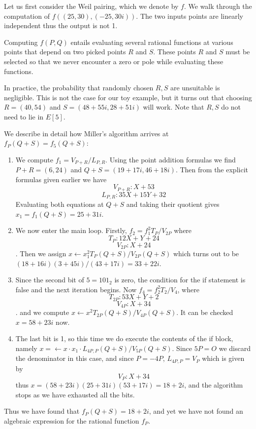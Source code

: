 Let us first consider the Weil pairing, which we denote by $f$.
We walk through the computation of $f((25,30), (-25,30i))$.
The two inputs points are linearly independent thus the output is not 1.

Computing $f(P, Q)$ entails evaluating several rational functions
at various points that depend on two picked points $R$ and $S$.
These points $R$ and $S$ must be selected so that we never encounter a
zero or pole while evaluating these functions.

In practice, the probability that randomly chosen $R, S$ are unsuitable
is negligible. This is not the case for our toy example, but it turns
out that choosing $R = (40,54)$ and $S = (48+55i,28+51i)$
will work. Note that $R, S$ do not need to lie in $E[5]$.

We describe in detail how Miller's algorithm arrives at $f_P(Q+S) = f_5(Q+S)$:
\begin{enumerate}
\item
We compute $f_1 = V_{P+R} / L_{P,R}$.
Using the point addition formulas we find $P+R = (6,24)$
and $Q+S=(19+17i, 46+18i)$.
Then
from the explicit formulas given earlier we have
\[ V_{P+R} : X + 53 \]
\[ L_{P,R} : 35 X + 15 Y + 32 \]
Evaluating both equations at $Q + S$ and taking their quotient
gives $x_1 = f_1(Q+S) = 25 + 31i$.
\item
We now enter the main loop.
Firstly, $f_2 = f_1^2 T_{P} / V_{2P}$ where
\[ T_{P} : 12 X + Y + 24 \]
\[ V_{2P} : X + 24 \].
Then we assign $x \gets x_1^2 T_{P}(Q+S) / V_{2P}(Q+S)$
which turns out to be $(18 + 16i)(3+45i)/(43+17i) = 33 + 22i$.
\item
Since the second bit of $5 = 101_2$ is zero, the condition for the if statement
is false and the next iteration begins. Now
$f_4 = f_2^2 T_2 / V_4$, where
\[ T_{2P} : 53 X + Y + 2 \]
\[ V_{4P} : X + 34 \].
and we compute $x \gets x^2 T_{2P}(Q+S) / V_{4P}(Q+S)$.
It can be checked $x = 58 + 23i$ now.
\item
The last bit is 1, so this time we do execute the contents of the if block,
namely $x=\gets x \cdot x_1 \cdot L_{4P,P}(Q+S)/V_{5P}(Q+S)$.
Since $5P = O$ we discard the denominator in this case, and since $P = -4P$,
$L_{4P, P} = V_P$ which is given by
\[ V_P : X + 34 \] thus $x = (58+23i)(25+31i)(53+17i) = 18 + 2i$,
and the algorithm stops as we have exhausted all the bits.
\end{enumerate}

Thus we have found that $f_P(Q+S) = 18+2i$, and yet we have not found
an algebraic expression for the rational function $f_P$.

